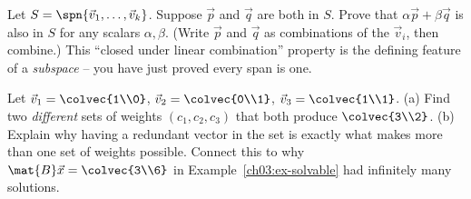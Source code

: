 \begin{exercise}\label{ch03:ex-closed}
Let $S = \spn\{\vec{v}_1,\dots,\vec{v}_k\}$. Suppose $\vec{p}$ and $\vec{q}$ are both in $S$. Prove that $\alpha\vec{p} + \beta\vec{q}$ is also in $S$ for any scalars $\alpha,\beta$. (Write $\vec{p}$ and $\vec{q}$ as combinations of the $\vec{v}_i$, then combine.) This ``closed under linear combination'' property is the defining feature of a \emph{subspace} -- you have just proved every span is one.
\end{exercise}

\begin{exercise}\label{ch03:ex-challenge}
Let $\vec{v}_1 = \colvec{1\\0}$, $\vec{v}_2 = \colvec{0\\1}$, $\vec{v}_3 = \colvec{1\\1}$.
(a) Find two \emph{different} sets of weights $(c_1,c_2,c_3)$ that both produce $\colvec{3\\2}$.
(b) Explain why having a redundant vector in the set is exactly what makes more than one set of weights possible. Connect this to why $\mat{B}\vec{x}=\colvec{3\\6}$ in Example~\ref{ch03:ex-solvable} had infinitely many solutions.
\end{exercise}
